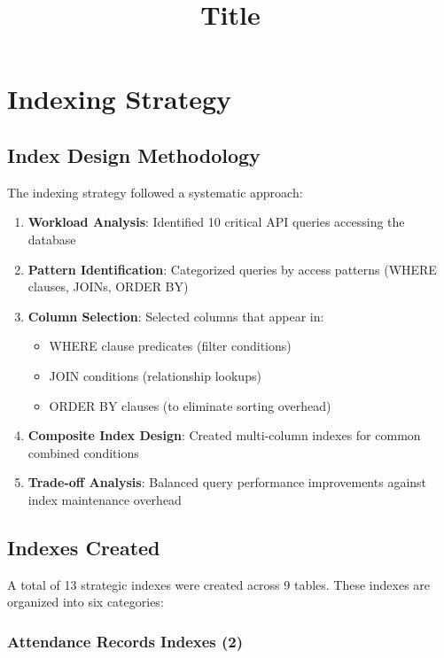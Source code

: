 \documentclass[conference]{IEEEtran}
\begin{document}
\title{Title}

\maketitle

\section{Indexing Strategy}

\subsection{Index Design Methodology}

The indexing strategy followed a systematic approach:

\begin{enumerate}
    \item \textbf{Workload Analysis}: Identified 10 critical API queries accessing the database
    \item \textbf{Pattern Identification}: Categorized queries by access patterns (WHERE clauses, JOINs, ORDER BY)
    \item \textbf{Column Selection}: Selected columns that appear in:
        \begin{itemize}
            \item WHERE clause predicates (filter conditions)
            \item JOIN conditions (relationship lookups)
            \item ORDER BY clauses (to eliminate sorting overhead)
        \end{itemize}
    \item \textbf{Composite Index Design}: Created multi-column indexes for common combined conditions
    \item \textbf{Trade-off Analysis}: Balanced query performance improvements against index maintenance overhead
\end{enumerate}

\subsection{Indexes Created}

A total of 13 strategic indexes were created across 9 tables. These indexes are organized into six categories:

\subsubsection{Attendance Records Indexes (2)}
\end{document}
